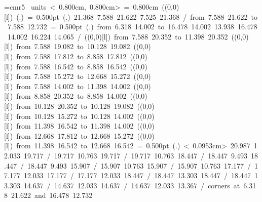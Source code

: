 \font\thinlinefont=cmr5
\mbox{\beginpicture
\setcoordinatesystem units < 0.800cm, 0.800cm>
\unitlength= 0.800cm
\linethickness=1pt
\setplotsymbol ({\makebox(0,0)[l]{\tencirc{}}})
\setshadesymbol ({\thinlinefont .})
\setlinear
%
%
\linethickness= 0.500pt
\setplotsymbol ({\thinlinefont .})
%
%
 21.368  7.588 21.622  7.525 21.368 /
%
\putrule from  7.588 21.622 to  7.588 12.732
%
%
\linethickness= 0.500pt
\setplotsymbol ({\thinlinefont .})
\putrule from  6.318 14.002 to 16.478 14.002
%
%
 13.938 16.478 14.002 16.224 14.065 /
%
%
%
\linethickness=1pt
\setplotsymbol ({\makebox(0,0)[l]{\tencirc{}}})
\putrule from  7.588 20.352 to 11.398 20.352
%
%
\linethickness=1pt
\setplotsymbol ({\makebox(0,0)[l]{\tencirc{}}})
\putrule from  7.588 19.082 to 10.128 19.082
%
%
\linethickness=1pt
\setplotsymbol ({\makebox(0,0)[l]{\tencirc{}}})
\putrule from  7.588 17.812 to  8.858 17.812
%
%
\linethickness=1pt
\setplotsymbol ({\makebox(0,0)[l]{\tencirc{}}})
\putrule from  7.588 16.542 to  8.858 16.542
%
%
\linethickness=1pt
\setplotsymbol ({\makebox(0,0)[l]{\tencirc{}}})
\putrule from  7.588 15.272 to 12.668 15.272
%
%
\linethickness=1pt
\setplotsymbol ({\makebox(0,0)[l]{\tencirc{}}})
\putrule from  7.588 14.002 to 11.398 14.002
%
%
\linethickness=1pt
\setplotsymbol ({\makebox(0,0)[l]{\tencirc{}}})
\putrule from  8.858 20.352 to  8.858 14.002
%
%
\linethickness=1pt
\setplotsymbol ({\makebox(0,0)[l]{\tencirc{}}})
\putrule from 10.128 20.352 to 10.128 19.082
%
%
\linethickness=1pt
\setplotsymbol ({\makebox(0,0)[l]{\tencirc{}}})
\putrule from 10.128 15.272 to 10.128 14.002
%
%
\linethickness=1pt
\setplotsymbol ({\makebox(0,0)[l]{\tencirc{}}})
\putrule from 11.398 16.542 to 11.398 14.002
%
%
\linethickness=1pt
\setplotsymbol ({\makebox(0,0)[l]{\tencirc{}}})
\putrule from 12.668 17.812 to 12.668 15.272
%
%
\linethickness=1pt
\setplotsymbol ({\makebox(0,0)[l]{\tencirc{}}})
\putrule from 11.398 16.542 to 12.668 16.542
%
%
\linethickness= 0.500pt
\setplotsymbol ({\thinlinefont .})
\setdots < 0.0953cm>
 20.987 12.033 19.717 /
 19.717 10.763 19.717 /
 19.717 10.763 18.447 /
 18.447  9.493 18.447 /
 18.447  9.493 15.907 /
 15.907 10.763 15.907 /
 15.907 10.763 17.177 /
 17.177 12.033 17.177 /
 17.177 12.033 18.447 /
 18.447 13.303 18.447 /
 18.447 13.303 14.637 /
 14.637 12.033 14.637 /
 14.637 12.033 13.367 /
\linethickness=0pt
\putrectangle corners at  6.318 21.622 and 16.478 12.732
\endpicture}

